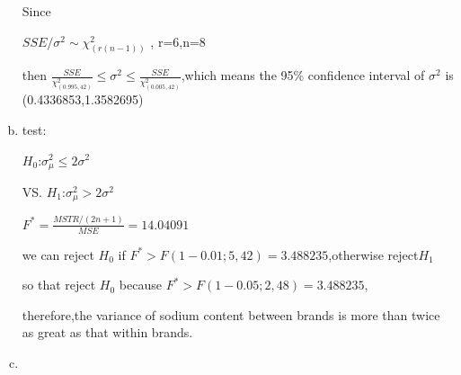 \documentclass{article}\usepackage[]{graphicx}\usepackage[]{color}
\begin{document}
\begin{enumerate}[(a)]
Since

\qquad $SSE/\sigma^2 \sim \chi^2_{(r(n-1))}$ , r=6,n=8

then $\frac{SSE}{\chi^2_{(0.995, 42)}} \leq \sigma^2 \leq \frac{SSE}{\chi^2_{(0.005, 42)}}$,which means the 95\% confidence interval of $\sigma^2$ is (0.4336853,1.3582695)

\item

test:

\begin{center}
$H_0$:$\sigma_\mu^2 \leq 2\sigma^2$

VS. $H_1$:$\sigma_\mu^2 > 2\sigma^2$

$F^*=\frac{MSTR/(2n+1)}{MSE} = 14.04091$

we can reject $H_0$ if $F^* > F(1-0.01;5,42)=3.488235$,otherwise reject$H_1$

so that reject $H_0$ because $F^*>F(1-0.05;2,48)=3.488235$,

therefore,the variance of sodium content between brands is more than twice as great as that within brands.
\end{center}

\item


\end{enumerate}
\end{document}
